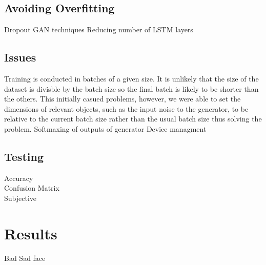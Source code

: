\subsection{Avoiding Overfitting}
Dropout
GAN techniques
Reducing number of LSTM layers
\subsection{Issues}
Training is conducted in batches of a given size.
It is unlikely that the size of the dataset is divisble by the batch size so the final batch is likely to be shorter than the others.
This initially casued problems, however, we were able to set the dimensions of relevant objects, such as the input noise to the generator, to be relative to the current batch size rather than the usual batch size thus solving the problem.
Softmaxing of outputs of generator
Device managment

\subsection{Testing}
Accuracy \\
Confusion Matrix\\
Subjective
\section{Results}
Bad Sad face
